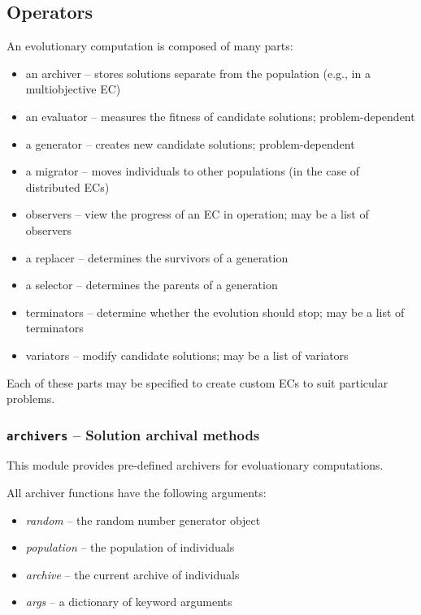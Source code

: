 \documentclass[letterpaper,10pt,english]{sphinxmanual}
\begin{document}
\subsection{Operators}
\label{reference:operators}
An evolutionary computation is composed of many parts:
\begin{itemize}
\item {} 
an archiver -- stores solutions separate from the population (e.g., in a multiobjective EC)

\item {} 
an evaluator -- measures the fitness of candidate solutions; problem-dependent

\item {} 
a generator -- creates new candidate solutions; problem-dependent

\item {} 
a migrator -- moves individuals to other populations (in the case of distributed ECs)

\item {} 
observers -- view the progress of an EC in operation; may be a list of observers

\item {} 
a replacer -- determines the survivors of a generation

\item {} 
a selector -- determines the parents of a generation

\item {} 
terminators -- determine whether the evolution should stop; may be a list of terminators

\item {} 
variators -- modify candidate solutions; may be a list of variators

\end{itemize}

Each of these parts may be specified to create custom ECs to suit particular problems.
\label{reference:module-inspyred.ec.archivers}

\subsubsection{\texttt{archivers} -- Solution archival methods}
\label{reference:archivers-solution-archival-methods}
This module provides pre-defined archivers for evoluationary computations.

All archiver functions have the following arguments:
\begin{itemize}
\item {} 
\emph{random} -- the random number generator object

\item {} 
\emph{population} -- the population of individuals

\item {} 
\emph{archive} -- the current archive of individuals

\item {} 
\emph{args} -- a dictionary of keyword arguments

\end{itemize}
\end{document}
